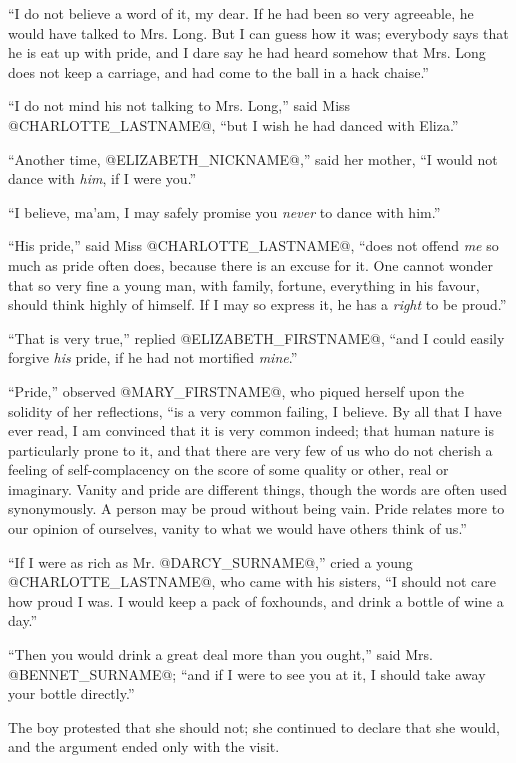 ``I do not believe a word of it, my dear. If he had been so very
agreeable, he would have talked to Mrs. Long. But I can guess how it
was; everybody says that he is eat up with pride, and I dare say he had
heard somehow that Mrs. Long does not keep a carriage, and had come to
the ball in a hack chaise.''

``I do not mind his not talking to Mrs. Long,'' said Miss @CHARLOTTE_LASTNAME@, ``but I
wish he had danced with Eliza.''

``Another time, @ELIZABETH_NICKNAME@,'' said her mother, ``I would not dance with \textit{him},
if I were you.''

``I believe, ma'am, I may safely promise you \textit{never} to dance with him.''

``His pride,'' said Miss @CHARLOTTE_LASTNAME@, ``does not offend \textit{me} so much as pride
often does, because there is an excuse for it. One cannot wonder that so
very fine a young man, with family, fortune, everything in his favour,
should think highly of himself. If I may so express it, he has a \textit{right}
to be proud.''

``That is very true,'' replied @ELIZABETH_FIRSTNAME@, ``and I could easily forgive
\textit{his} pride, if he had not mortified \textit{mine}.''

``Pride,'' observed @MARY_FIRSTNAME@, who piqued herself upon the solidity of her
reflections, ``is a very common failing, I believe. By all that I have
ever read, I am convinced that it is very common indeed; that human
nature is particularly prone to it, and that there are very few of us
who do not cherish a feeling of self-complacency on the score of some
quality or other, real or imaginary. Vanity and pride are different
things, though the words are often used synonymously. A person may
be proud without being vain. Pride relates more to our opinion of
ourselves, vanity to what we would have others think of us.''

``If I were as rich as Mr. @DARCY_SURNAME@,'' cried a young @CHARLOTTE_LASTNAME@, who came with
his sisters, ``I should not care how proud I was. I would keep a pack of
foxhounds, and drink a bottle of wine a day.''

``Then you would drink a great deal more than you ought,'' said Mrs.
@BENNET_SURNAME@; ``and if I were to see you at it, I should take away your bottle
directly.''

The boy protested that she should not; she continued to declare that she
would, and the argument ended only with the visit.



